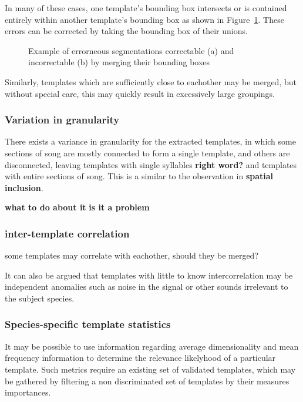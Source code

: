 In many of these cases, one template's bounding box intersects or is contained
entirely within another template's bounding box as shown in
Figure~\ref{fig:segment_intersect_a}.
These errors can be corrected by taking the bounding box of their unions.

\begin{figure}[h]
  \centering
  \begin{subfigure}[h]{0.5\textwidth}
    \centering
    \caption{}\label{fig:segment_intersect_a}
  \end{subfigure}
  \begin{subfigure}[h]{0.5\textwidth}
    \centering
    \caption{}
  \end{subfigure}
  \caption{Example of errorneous segmentations correctable (a) and incorrectable (b)
  by merging their bounding boxes}
  \label{fig:segment_intersect}
\end{figure}

Similarly, templates which are sufficiently close to eachother may be merged,
but without special care, this may quickly result in excessively large groupings.

\subsubsection{Variation in granularity}
There exists a variance in granularity for the extracted templates, in which
some sections of song are mostly connected to form a single template, and others
are disconnected, leaving templates with single syllables \textbf{right word?}
and templates with entire sections of song.
This is a similar to the observation in \textbf{spatial inclusion}.

\textbf{what to do about it}
\textbf{is it a problem}


\subsubsection{inter-template correlation}
some templates may correlate with eachother, should they be merged?

It can also be argued that templates with little to know intercorrelation may be
independent anomalies such as noise in the signal or other sounds irrelevant to
the subject species.

\subsubsection{Species-specific template statistics}
It may be possible to use information regarding average dimensionality and mean
frequency information to determine the relevance likelyhood of a particular template.
Such metrics require an existing set of validated templates, which may be gathered
by filtering a non discriminated set of templates by their measures importances.
